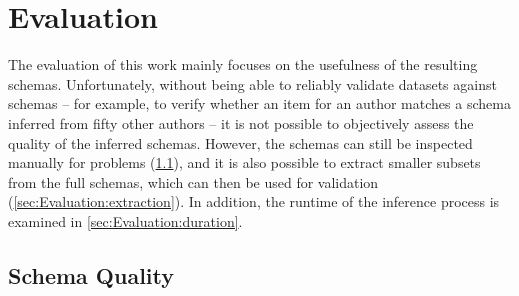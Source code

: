 
\chapter{Evaluation}
\label{ch:Evaluation}

The evaluation of this work
mainly focuses on the usefulness of the resulting schemas.
Unfortunately, without being able to reliably validate datasets against schemas –
for example, to verify whether an item for an author
matches a schema inferred from fifty other authors –
it is not possible to objectively assess the quality of the inferred schemas.
However, the schemas can still be inspected manually for problems (\cref{sec:Evaluation:quality}),
and it is also possible to extract smaller subsets from the full schemas,
which can then be used for validation (\cref{sec:Evaluation:extraction}).
In addition, the runtime of the inference process is examined in \cref{sec:Evaluation:duration}.

\section{Schema Quality}
\label{sec:Evaluation:quality}


